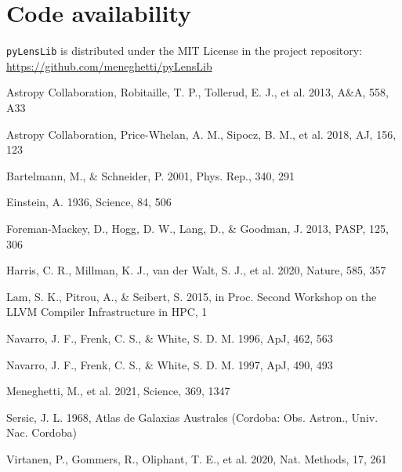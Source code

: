 \documentclass{aa}
\newcommand{\pylenslib}{\texttt{pyLensLib}\xspace}
\begin{document}
\section*{Code availability}
\pylenslib is distributed under the MIT License in the project repository:
\url{https://github.com/meneghetti/pyLensLib}

\begin{thebibliography}{}
Astropy Collaboration, Robitaille, T. P., Tollerud, E. J., et al. 2013, A\&A, 558, A33

Astropy Collaboration, Price-Whelan, A. M., Sipocz, B. M., et al. 2018, AJ, 156, 123

Bartelmann, M., \& Schneider, P. 2001, Phys. Rep., 340, 291

Einstein, A. 1936, Science, 84, 506

Foreman-Mackey, D., Hogg, D. W., Lang, D., \& Goodman, J. 2013, PASP, 125, 306

Harris, C. R., Millman, K. J., van der Walt, S. J., et al. 2020, Nature, 585, 357

Lam, S. K., Pitrou, A., \& Seibert, S. 2015, in Proc. Second Workshop on the LLVM Compiler Infrastructure in HPC, 1

Navarro, J. F., Frenk, C. S., \& White, S. D. M. 1996, ApJ, 462, 563

Navarro, J. F., Frenk, C. S., \& White, S. D. M. 1997, ApJ, 490, 493

Meneghetti, M., et al. 2021, Science, 369, 1347

Sersic, J. L. 1968, Atlas de Galaxias Australes (Cordoba: Obs. Astron., Univ. Nac. Cordoba)

Virtanen, P., Gommers, R., Oliphant, T. E., et al. 2020, Nat. Methods, 17, 261
\end{thebibliography}
\end{document}
